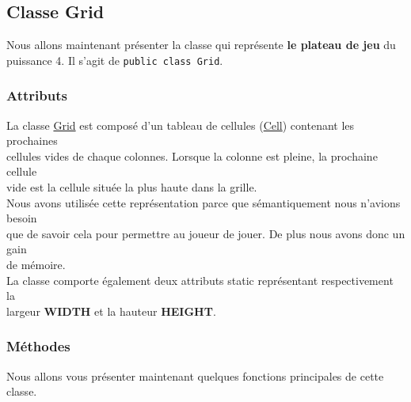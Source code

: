 \documentclass[11pt]{article}
\begin{document}
\subsection{Classe Grid\label{orgbab96b7}}
\label{sec:org8a51e52}

Nous allons maintenant présenter la classe qui représente \textbf{le plateau de jeu} du\\
puissance 4. Il s'agit de \texttt{public class Grid}.\\

\subsubsection{Attributs}
\label{sec:org3067227}

La classe \hyperref[orgbab96b7]{Grid} est composé d'un tableau de cellules (\hyperref[orgc81d8e8]{Cell}) contenant les prochaines\\
cellules vides de chaque colonnes. Lorsque la colonne est pleine, la prochaine cellule\\
vide est la cellule située la plus haute dans la grille.\\

Nous avons utilisée cette représentation parce que sémantiquement nous n'avions besoin\\
que de savoir cela pour permettre au joueur de jouer. De plus nous avons donc un gain\\
de mémoire.\\

La classe comporte également deux attributs static représentant respectivement la\\
largeur \textbf{WIDTH} et la hauteur \textbf{HEIGHT}.\\

\subsubsection{Méthodes}
\label{sec:org239e0e6}

Nous allons vous présenter maintenant quelques fonctions principales de cette classe.\\
\end{document}
